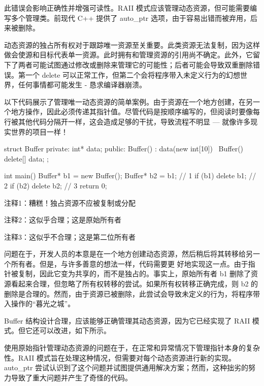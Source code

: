 此错误会影响正确性并增强可读性。RAII 模式应该管理动态资源，但可能需要编写多个管理类。前现代 C++ 提供了 auto\_ptr 选项，由于容易出错而被弃用，后来被删除。


动态资源的独占所有权对于跟踪唯一资源至关重要。此类资源无法复制，因为这样做会使源和目标代表单一资源。此时拥有和管理资源的引用尚不确定。此外，它留下了两者可能试图通过修改或删除来管理它的可能性；后者可能会导致双重删除错误。第一个 delete 可以正常工作，但第二个会将程序带入未定义行为的幻想世界，任何事情都可能发生 - 恳求编译器崩溃。

以下代码展示了管理唯一动态资源的简单案例。由于资源在一个地方创建，在另一个地方操作，因此必须传递其指针值。尽管代码是按顺序编写的，但阅读时要像每行被其他代码分隔开一样，这会造成足够的干扰，导致流程不明显 — 就像许多现实世界的项目一样！


\begin{cpp}
struct Buffer {
private:
  int* data;
public:
  Buffer() : data(new int[10]) {}
  ~Buffer() { delete[] data; }
};

int main() {
  Buffer* b1 = new Buffer();
  Buffer* b2 = b1; // 1
  if (b1)
    delete b1; // 2
  if (b2)
    delete b2; // 3
  return 0;
}
\end{cpp}

{\footnotesize
注释1：糟糕！独占资源不应被复制或分配

注释2：这似乎合理；这是原始所有者

注释3：这似乎不合理；这是第二位所有者
}


问题在于，开发人员的本意是在一个地方创建动态资源，然后稍后将其转移给另一个所有者。但是，与许多善意的想法一样，代码需要更 好地实现这一点。由于指针被复制，因此它变为共享的，而不是独占的。事实上，原始所有者 b1 删除了资源看起来合理，但忽略了所有权转移的尝试。如果所有权转移正确完成，则 b2 的删除是合理的。然而，由于资源已被删除，此尝试会导致未定义的行为，将程序带入操作的“暮光之城”。

Buffer 结构设计合理，应该能够正确管理其动态资源，因为它已经实现了 RAII 模式。但它还可以改进，如下所示。


使用原始指针管理动态资源的问题在于，在正常和异常情况下管理指针本身的复杂性。RAII 模式旨在处理这种情况，但需要对每个动态资源进行新的实现。auto\_ptr 尝试认识到了这个问题并试图提供通用解决方案；然而，这种拙劣的努力导致了重大问题并产生了奇怪的代码。

